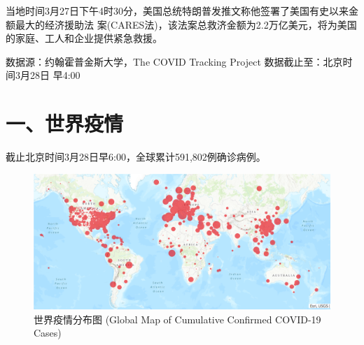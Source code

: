\documentclass[11,]{article}
\begin{document}
当地时间3月27日下午4时30分，美国总统特朗普发推文称他签署了美国有史以来金额最大的经济援助法
案(CARES法)，该法案总救济金额为2.2万亿美元，将为美国的家庭、工人和企业提供紧急救援。

%
  \noindent{}%

数据源：约翰霍普金斯大学，The COVID Tracking Project
数据截止至：北京时间3月28日 早4:00

\hypertarget{section-2}{%
\section{\texorpdfstring{\textcolor{glaucous}{一、世界疫情}}{}}\label{section-2}}

截止北京时间3月28日早6:00，全球累计591,802例确诊病例。

\begin{figure}[htbp] 
\centering %
\includegraphics[]{./test/covid1.png} %
\caption{世界疫情分布图 (Global Map of Cumulative Confirmed COVID-19 Cases)} %
\label{} %
\end{figure}

\begin{table}[]
\caption{累计确诊前十位国家}
\centering
{}
\end{table}
\end{document}
